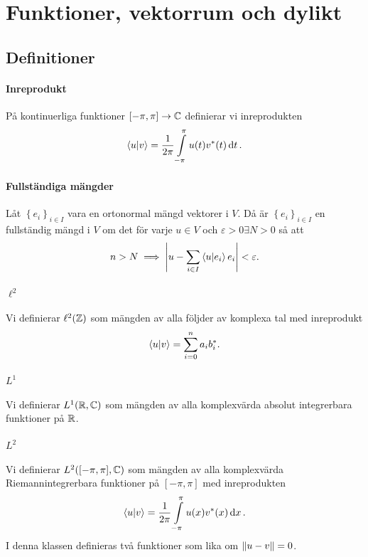 \section{Funktioner, vektorrum och dylikt}

\subsection{Definitioner}

\paragraph{Inreprodukt}
På kontinuerliga funktioner $[-\pi, \pi] \to \mathbb{C}$ definierar vi inreprodukten
\begin{align*}
	\bra{u}\ket{v} = \frac{1}{2\pi}\int\limits_{-\pi}^{\pi}u(t)v^{*}(t)\dd{t}.
\end{align*}

\paragraph{Fullständiga mängder}
Låt $\left\{e_{i}\right\}_{i\in I}$ vara en ortonormal mängd vektorer i $V$. Då är $\left\{e_{i}\right\}_{i\in I}$ en fullständig mängd i $V$ om det för varje $u\in V$ och $\varepsilon >0 \exists N >0$ så att
\begin{align*}
	n > N\implies \abs{u - \sum\limits_{i\in I}\bra{u}\ket{e_{i}}e_{i}} < \varepsilon.
\end{align*}

\paragraph{$\ell^{2}$}
Vi definierar $\ell^{2}(\mathbb{Z})$ som mängden av alla följder av komplexa tal med inreprodukt
\begin{align*}
	\bra{u}\ket{v} = \sum\limits_{i = 0}^{n}a_{i}b_{i}^{*}.
\end{align*}

\paragraph{$L^{1}$}
Vi definierar $L^{1}(\mathbb{R}, \mathbb{C})$ som mängden av alla komplexvärda absolut integrerbara funktioner på $\mathbb{R}$.

\paragraph{$L^{2}$}
Vi definierar $L^{2}([-\pi, \pi], \mathbb{C})$ som mängden av alla komplexvärda Riemannintegrerbara funktioner på $[-\pi, \pi]$ med inreprodukten
\begin{align*}
	\bra{u}\ket{v} = \frac{1}{2\pi}\int\limits_{-\pi}^{\pi}u(x)v^{*}(x)\dd{x}.
\end{align*}
I denna klassen definieras två funktioner som lika om $\norm{u - v} = 0$.

